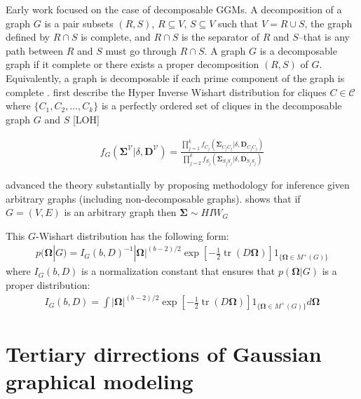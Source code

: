 \documentclass[11pt]{article}
\DeclareMathOperator{\tr}{tr}
\begin{document}
Early work \citep{dawid1993} focused on the case of decomposable GGMs. A decomposition of a graph $G$ is a pair subsets $(R,S)$, $R\subseteq V$, $S\subseteq V$ such that $V=R \cup S$, the graph defined by $R \cap S$ is complete, and $R \cap S$ is the separator of $R$ and $S$--that is any path between $R$ and $S$ must go through $R \cap S$. A graph $G$ is a decomposable graph if it complete or there exists a proper decomposition $(R,S)$ of $G$. Equivalently, a graph is decomposable if each prime component of the graph is complete \cite{roverato2002}. \cite{dawid1993} first describe the Hyper Inverse Wishart distribution for cliques $C\in \mathcal{C}$ where $\{C_1,C_2, \hdots,C_k \}$ is a perfectly ordered set of cliques in the decomposable graph $G$ and $S$ [LOH]

\begin{align}
f_G(\boldsymbol{\Sigma}^{\mathcal{V}}|\delta,\textbf{D}^{\mathcal{V}})= \frac{\prod_{j=1}^k f_{C_j}(\boldsymbol{\Sigma}_{C_j C_j}|\delta,\textbf{D}_{C_j C_j})}{\prod_{j=2}^k f_{S_j}(\boldsymbol{\Sigma}_{S_j S_j}|\delta,\textbf{D}_{S_j S_j})}
\end{align}

\cite{roverato2002} advanced the theory substantially by proposing methodology for inference given arbitrary graphs (including non-decomposable graphs). \cite{roverato2002} shows that if $G=(V,E)$ is an arbitrary graph then $\boldsymbol{\Sigma} \sim HIW_G$

This $G$-Wishart distribution has the following form: 
\begin{align}
p(\boldsymbol{\Omega}|G)=I_G(b,D)^{-1}|\boldsymbol{\Omega}|^{(b-2)/2} \exp \left[-\frac{1}{2} \tr(D \boldsymbol{\Omega}) \right] 1_{ \{\boldsymbol{\Omega} \in M^+(G)\} }
\end{align}
where $I_G(b,D)$ is a normalization constant that ensures that $p(\boldsymbol{\Omega}|G)$ is a proper distribution:
\begin{align}
I_G(b,D)=\int |\boldsymbol{\Omega}|^{(b-2)/2} \exp \left[-\frac{1}{2} \tr(D \boldsymbol{\Omega}) \right] 1_{ \{\boldsymbol{\Omega} \in M^+(G)\} } d\boldsymbol{\Omega}
\end{align}

\section{Tertiary dirrections of Gaussian graphical modeling}
\end{document}
